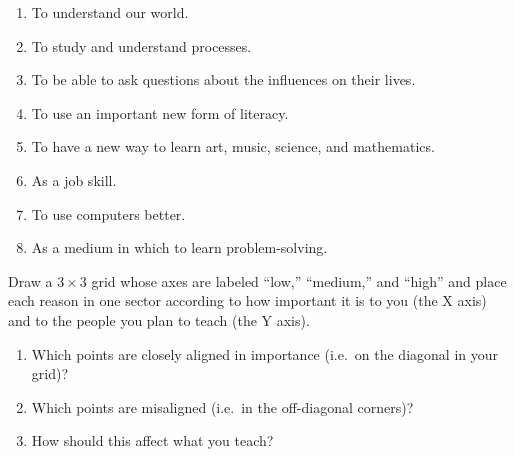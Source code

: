 \begin{enumerate}

\item
  To understand our world.

\item
  To study and understand processes.

\item
  To be able to ask questions about the influences on their lives.

\item
  To use an important new form of literacy.

\item
  To have a new way to learn art, music, science, and mathematics.

\item
  As a job skill.

\item
  To use computers better.

\item
  As a medium in which to learn problem-solving.

\end{enumerate}

Draw a $3{\times}3$ grid whose axes are labeled ``low,'' ``medium,'' and ``high''
and place each reason in one sector
according to how important it is to you (the X axis)
and to the people you plan to teach (the Y axis).

\begin{enumerate}

\item
  Which points are closely aligned in importance
  (i.e.\ on the diagonal in your grid)?

\item
  Which points are misaligned
  (i.e.\ in the off-diagonal corners)?

\item
  How should this affect what you teach?

\end{enumerate}
